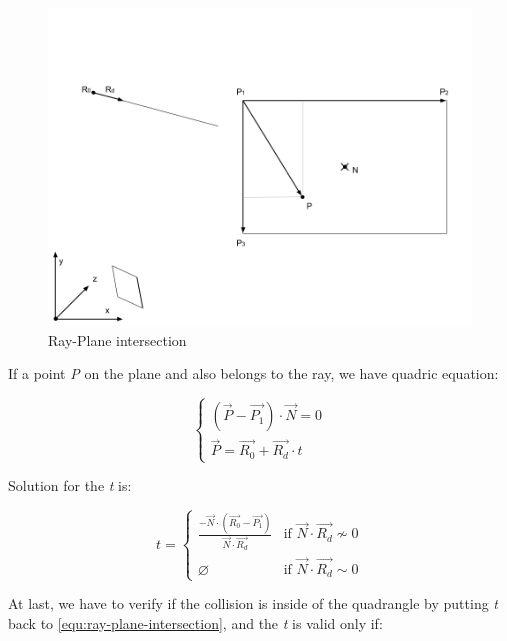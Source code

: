 \begin{figure}[H]\label{fig:ray-plane}
\centering
\includegraphics[width=\linewidth]{Figures/ray-plane-intersection.png}
\decoRule
\caption[ray-plane-intersection]{Ray-Plane intersection}
\end{figure}

If a point \emph{P} on the plane and also belongs to the ray, we have quadric equation:

\begin{equation}\label{equ:ray-plane-intersection}
\left\{
\begin{array}{lr}
(\overrightarrow{P} - \overrightarrow{P_1}) \cdot \overrightarrow{N} = 0 \\
\overrightarrow{P} = \overrightarrow{R_0} + \overrightarrow{R_d} \cdot t
\end{array}
\right.
\end{equation}

Solution for the \emph{t} is:

\[
t =
\begin{cases}
\frac{-\overrightarrow{N} \cdot (\overrightarrow{R_0} - \overrightarrow{P_1})}{\overrightarrow{N} \cdot \overrightarrow{R_d}} & \text{if } \overrightarrow{N} \cdot \overrightarrow{R_d} \nsim 0 \\
\varnothing & \text{if } \overrightarrow{N} \cdot \overrightarrow{R_d} \sim 0
\end{cases}
\]

At last, we have to verify if the collision is inside of the quadrangle by putting \emph{t} back to \ref{equ:ray-plane-intersection}, and the \emph{t} is valid only if:

